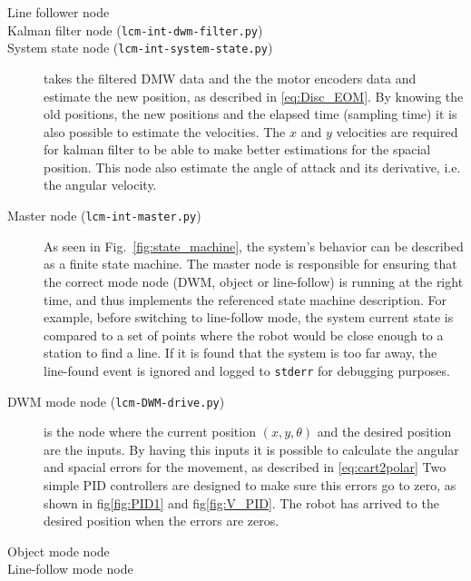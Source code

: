 \begin{description}
\item[Line follower node]

\item[Kalman filter node (\texttt{lcm-int-dwm-filter.py})]

\item[System state node (\texttt{lcm-int-system-state.py})]
 takes the filtered DMW data and the the motor encoders data and estimate the new position, as described in \eqref{eq:Disc_EOM}.
By knowing the old positions, the new positions and the elapsed time (sampling time) it is also possible to estimate the velocities. 
The $x$ and $y$ velocities are required for kalman filter to be able to make better estimations for the spacial position.
This node also estimate the angle of attack and its derivative, i.e. the angular velocity.


\item[Master node (\texttt{lcm-int-master.py})]
  As seen in Fig.~\ref{fig:state_machine}, the system's behavior can be described as a finite state machine.
  The master node is responsible for ensuring that the correct mode node (DWM, object or line-follow) is running at the right time,
  and thus implements the referenced state machine description.
  For example, before switching to line-follow mode, the system current state is compared to a set of points where the robot would be close enough to a station to find a line.
  If it is found that the system is too far away, the line-found event is ignored and logged to \texttt{stderr} for debugging purposes.

\item[DWM mode node (\texttt{lcm-DWM-drive.py})]
 is the node where the current position $(x, y, \theta)$ and the desired position are the inputs.
By having this inputs it is possible to calculate the angular and spacial errors for the movement, as described in \eqref{eq:cart2polar}
Two simple PID controllers are designed to make sure this errors go to zero, as shown in fig\ref{fig:PID1} and fig\ref{fig:V_PID}.
The robot has arrived to the desired position when the errors are zeros.

\item[Object mode node]

\item[Line-follow mode node]

\end{description}

